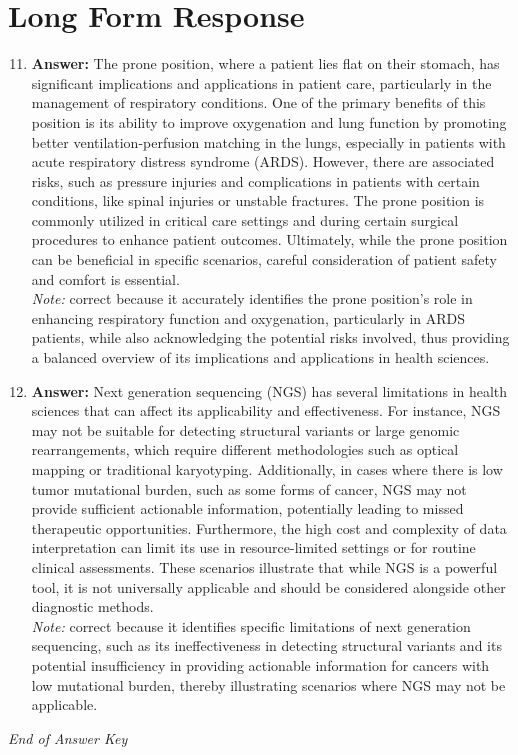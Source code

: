 \documentclass[12pt]{article}
\begin{document}
\section*{Long Form Response}
\begin{enumerate}[label=\arabic*.]
\setcounter{enumi}{10}
\item \textbf{Answer:} The prone position, where a patient lies flat on their stomach, has significant implications and applications in patient care, particularly in the management of respiratory conditions. One of the primary benefits of this position is its ability to improve oxygenation and lung function by promoting better ventilation-perfusion matching in the lungs, especially in patients with acute respiratory distress syndrome (ARDS). However, there are associated risks, such as pressure injuries and complications in patients with certain conditions, like spinal injuries or unstable fractures. The prone position is commonly utilized in critical care settings and during certain surgical procedures to enhance patient outcomes. Ultimately, while the prone position can be beneficial in specific scenarios, careful consideration of patient safety and comfort is essential.
\\ \textit{Note:} correct because it accurately identifies the prone position's role in enhancing respiratory function and oxygenation, particularly in ARDS patients, while also acknowledging the potential risks involved, thus providing a balanced overview of its implications and applications in health sciences.
\item \textbf{Answer:} Next generation sequencing (NGS) has several limitations in health sciences that can affect its applicability and effectiveness. For instance, NGS may not be suitable for detecting structural variants or large genomic rearrangements, which require different methodologies such as optical mapping or traditional karyotyping. Additionally, in cases where there is low tumor mutational burden, such as some forms of cancer, NGS may not provide sufficient actionable information, potentially leading to missed therapeutic opportunities. Furthermore, the high cost and complexity of data interpretation can limit its use in resource-limited settings or for routine clinical assessments. These scenarios illustrate that while NGS is a powerful tool, it is not universally applicable and should be considered alongside other diagnostic methods.
\\ \textit{Note:} correct because it identifies specific limitations of next generation sequencing, such as its ineffectiveness in detecting structural variants and its potential insufficiency in providing actionable information for cancers with low mutational burden, thereby illustrating scenarios where NGS may not be applicable.
\end{enumerate}

\vfill
\noindent\textit{End of Answer Key}
\end{document}
